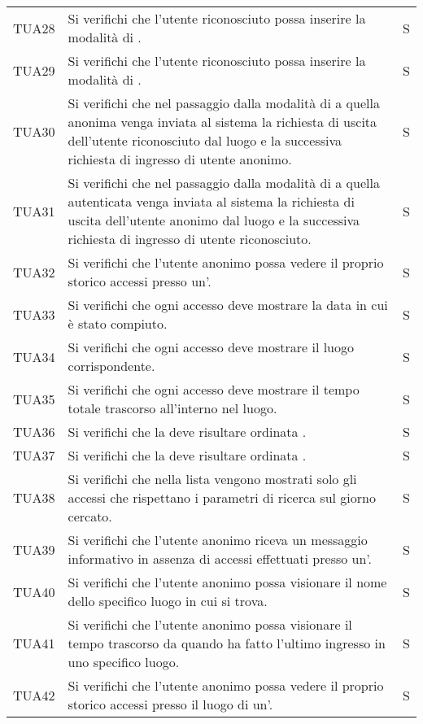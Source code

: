 {\begin{longtable}{ c C{13cm} C{1cm}}
TUA28 & Si verifichi che l'utente riconosciuto possa inserire la modalità di . & S \\
TUA29 & Si verifichi che l'utente riconosciuto possa inserire la modalità di . & S \\
TUA30 & Si verifichi che nel passaggio dalla modalità di  a quella anonima venga inviata al sistema la richiesta di uscita dell'utente riconosciuto dal luogo e la successiva richiesta di ingresso di utente anonimo. & S \\
TUA31 & Si verifichi che nel passaggio dalla modalità di  a quella autenticata venga inviata al sistema la richiesta di uscita dell'utente anonimo dal luogo e la successiva richiesta di ingresso di utente riconosciuto. & S \\
TUA32 & Si verifichi che l'utente anonimo possa vedere il proprio storico accessi presso un'. & S \\
TUA33 & Si verifichi che ogni accesso deve mostrare la data in cui è stato compiuto. & S \\
TUA34 & Si verifichi che ogni accesso deve mostrare il luogo corrispondente.  & S \\
TUA35 & Si verifichi che ogni accesso deve mostrare il tempo totale trascorso all'interno nel luogo. & S \\
TUA36 & Si verifichi che la  deve risultare ordinata . & S \\
TUA37 & Si verifichi che la  deve risultare ordinata . & S \\
TUA38 & Si verifichi che nella lista vengono mostrati solo gli accessi che rispettano i parametri di ricerca sul giorno cercato. & S \\
TUA39 & Si verifichi che l’utente anonimo riceva un messaggio informativo in assenza di accessi effettuati presso un'. & S \\
TUA40 & Si verifichi che l’utente anonimo possa visionare il nome dello specifico luogo in cui si trova. & S \\
TUA41 & Si verifichi che l’utente anonimo possa visionare il tempo trascorso da quando ha fatto l'ultimo ingresso in uno specifico luogo. & S \\
TUA42 & Si verifichi che l'utente anonimo possa vedere il proprio storico accessi presso il luogo di un'. & S \\

\end{longtable}}

